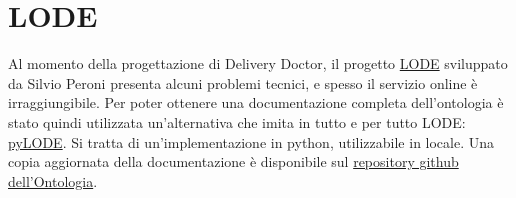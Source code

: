 \documentclass[12pt]{article}
\begin{document}
\section{LODE}
Al momento della progettazione di Delivery Doctor, il progetto \href{https://github.com/essepuntato/LODE}{LODE} sviluppato da Silvio Peroni presenta alcuni problemi tecnici, e spesso il servizio online è irraggiungibile. Per poter ottenere una documentazione completa dell'ontologia è stato quindi utilizzata un'alternativa che imita in tutto e per tutto LODE: \href{https://github.com/RDFLib/pyLODE}{pyLODE}. Si tratta di un'implementazione in python, utilizzabile in locale.\newline
Una copia aggiornata della documentazione è disponibile sul \href{https://lorenzosciandra.github.io/ProgettoModSem/documentazione/lode.html}{repository github dell'Ontologia}.

\end{document}
